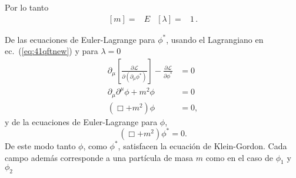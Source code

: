 \begin{frame}
Por lo tanto
\begin{align}
  \left[ m \right]=&E& \left[ \lambda \right]=&1\,.
\end{align}






De las ecuaciones de Euler-Lagrange para $\phi^*$, usando el Lagrangiano en ec.~(\ref{eq:41qftnew}) y para $\lambda=0$
\begin{align}
  \partial_\mu\left[
      \frac{\partial\mathcal{L}}{\partial(\partial_\mu\phi^*)}\right]-\frac{\partial\mathcal{L}}{\partial\phi^*}&=0\nonumber\\
    \partial_\mu\partial^\mu\phi+m^2\phi&=0\nonumber\\
    \label{eq:43qft}
    (\Box+m^2)\phi&=0,
\end{align}
y de la ecuaciones de Euler-Lagrange para $\phi$,
\begin{equation}
  \label{eq:44qft}
    (\Box+m^2)\phi^*=0.
\end{equation}
De este modo tanto $\phi$, como $\phi^*$, satisfacen la ecuación de Klein-Gordon. Cada campo además corresponde a una partícula de masa $m$ como en el caso de $\phi_1$ y $\phi_2$


\end{frame}
